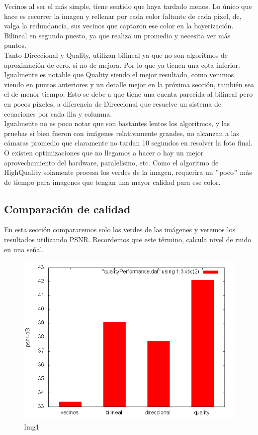 Vecinos al ser el más simple, tiene sentido que haya tardado menos. Lo único que hace es recorrer la imagen y rellenar por cada color faltante de cada pixel, de, valga la redundancia, sus vecinos que captaron ese color en la bayerización. Bilineal en segundo puesto, ya que realiza un promedio y necesita ver más puntos. \\
Tanto Direccional y Quality, utilizan bilineal ya que no son algoritmos de aproximación de cero, si no de mejora. Por lo que ya tienen una cota inferior. Igualmente es notable que Quality siendo el mejor resultado, como venimos viendo en puntos anteriores y un detalle mejor en la próxima sección, también sea el de menor tiempo. Esto se debe a que tiene una cuenta parecida al bilineal pero en pocos píxeles, a diferencia de Direccional que resuelve un sistema de ecuaciones por cada fila y columna.\\
Igualmente no es poco notar que son bastantes lentos los algoritmos, y las pruebas si bien fueron con imágenes relativamente grandes, no alcanzan a las cámaras promedio que claramente no tardan 10 segundos en resolver la foto final. O existen optimizaciones que no llegamos a hacer o hay un mejor aprovechamiento del hardware, paralelismo, etc.
Como el algoritmo de HighQuality solamente procesa los verdes de la imagen, requerira un $"$poco$"$ más de tiempo para imagenes que tengan una mayor calidad para ese color.




\subsection{Comparación de calidad}
En esta sección compararemos solo los verdes de las imágenes y veremos los resultados utilizando PSNR. Recordemos que este término, calcula nivel de ruido en una señal.

\begin{figure}[h]
       \includegraphics[scale=0.8]{imagenes/quality_performance.png}
       \caption{Img1}
\end{figure}

